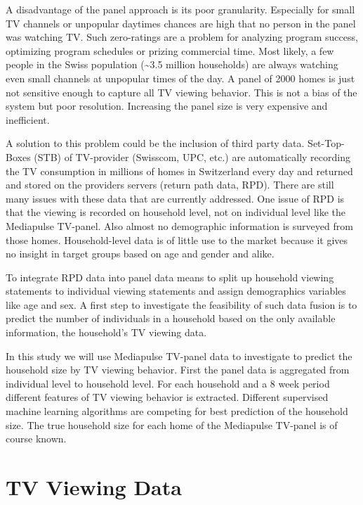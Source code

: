 \documentclass[]{article}
\begin{document}
A disadvantage of the panel approach is its poor granularity. Especially
for small TV channels or unpopular daytimes chances are high that no
person in the panel was watching TV. Such zero-ratings are a problem for
analyzing program success, optimizing program schedules or prizing
commercial time. Most likely, a few people in the Swiss population
(\textasciitilde{}3.5 million households) are always watching even small
channels at unpopular times of the day. A panel of 2000 homes is just
not sensitive enough to capture all TV viewing behavior. This is not a
bias of the system but poor resolution. Increasing the panel size is
very expensive and inefficient.

A solution to this problem could be the inclusion of third party data.
Set-Top-Boxes (STB) of TV-provider (Swisscom, UPC, etc.) are
automatically recording the TV consumption in millions of homes in
Switzerland every day and returned and stored on the providers servers
(return path data, RPD). There are still many issues with these data
that are currently addressed. One issue of RPD is that the viewing is
recorded on household level, not on individual level like the Mediapulse
TV-panel. Also almost no demographic information is surveyed from those
homes. Household-level data is of little use to the market because it
gives no insight in target groups based on age and gender and alike.

To integrate RPD data into panel data means to split up household
viewing statements to individual viewing statements and assign
demographics variables like age and sex. A first step to investigate the
feasibility of such data fusion is to predict the number of individuals
in a household based on the only available information, the household's
TV viewing data.

In this study we will use Mediapulse TV-panel data to investigate to
predict the household size by TV viewing behavior. First the panel data
is aggregated from individual level to household level. For each
household and a 8 week period different features of TV viewing behavior
is extracted. Different supervised machine learning algorithms are
competing for best prediction of the household size. The true household
size for each home of the Mediapulse TV-panel is of course known.

\hypertarget{tv-viewing-data}{%
\section{TV Viewing Data}\label{tv-viewing-data}}
\end{document}
